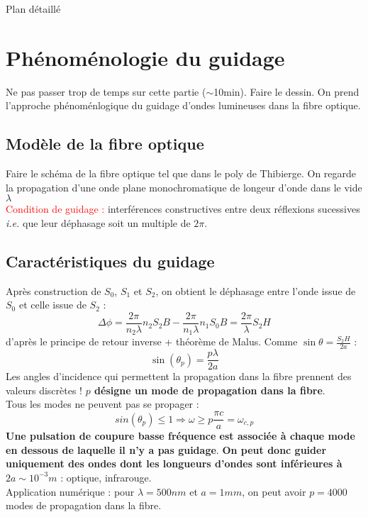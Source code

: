 \begin{reportBlock}{Plan détaillé}
  \section{Phénoménologie du guidage}
  Ne pas passer trop de temps sur cette partie ($\sim$10min). Faire le dessin. On prend l'approche phénoménlogique du guidage d'ondes lumineuses dans la fibre optique.
  
  \subsection{Modèle de la fibre optique}
  
  Faire le schéma de la fibre optique tel que dans le poly de Thibierge. On regarde la propagation d'une onde plane monochromatique de longeur d'onde dans le vide $\lambda$\\
  \textcolor{red}{Condition de guidage :} interférences constructives entre deux réflexions sucessives \textit{i.e.} que leur déphasage soit un multiple de $2\pi$.\\
  
  \subsection{Caractéristiques du guidage}
  Après construction de $S_0$, $S_1$ et $S_2$, on obtient le déphasage entre l'onde issue de $S_0$ et celle issue de $S_2$ :
  \begin{equation}
      \Delta\phi = \frac{2\pi}{n_2\lambda}n_2S_2B - \frac{2\pi}{n_1\lambda}n_1S_0B = \frac{2\pi}{\lambda}S_2H
  \end{equation}
  d'après le principe de retour inverse + théorème de Malus. Comme $\sin{\theta}=\frac{S_2H}{2a}$ : 
  \begin{equation}
      \sin(\theta_p) = \frac{p\lambda}{2a}
  \end{equation}
  Les angles d'incidence qui permettent la propagation dans la fibre prennent des valeurs discrètes ! \textbf{$p$ désigne un mode de propagation dans la fibre}.\\

  Tous les modes ne peuvent pas se propager :
  \begin{equation}
      sin(\theta_p)\leq 1 \Rightarrow \omega \geq p\frac{\pi c}{a} = \omega_{c,p}
  \end{equation}
  \textbf{Une pulsation de coupure basse fréquence est associée à chaque mode en dessous de laquelle il n'y a pas guidage}. \textbf{On peut donc guider uniquement des ondes dont les longueurs d'ondes sont inférieures à $2a\sim10^{-3}m$} : optique, infrarouge.\\
  Application numérique : pour $\lambda=500nm$ et $a=1mm$, on peut avoir $p=4000$ modes de propagation dans la fibre.\\


\end{reportBlock}
